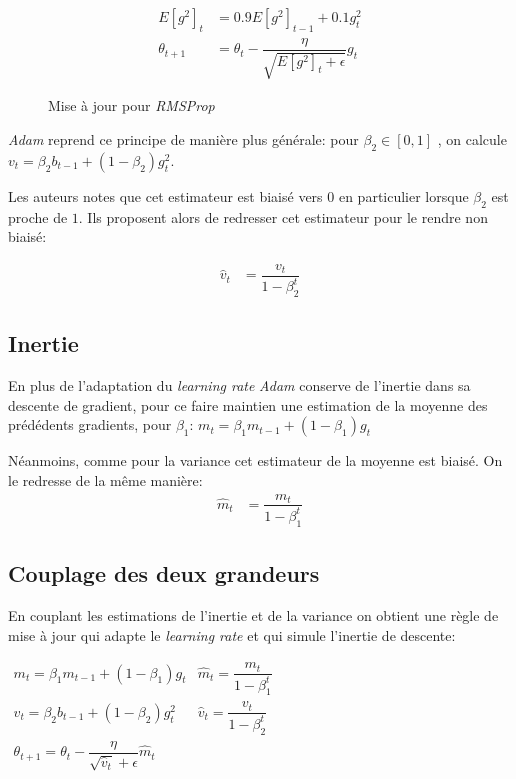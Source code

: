 \documentclass[fleqn,11pt, french, ceqn]{article}
\begin{document}
	\begin{figure}[H]
		\centering
		\begin{align*}
			E[g^2]_t &= 0.9 E[g^2]_{t-1} + 0.1 g^2_t \\ 
			\theta_{t+1} &= \theta_{t} - \dfrac{\eta}{\sqrt{E[g^2]_t + \epsilon}} g_{t} 
		\end{align*}
		\caption{Mise à jour pour \emph{RMSProp}}
	\end{figure}

	\emph{Adam} reprend ce principe de manière plus générale: pour $\beta_2 \in [0,1]$ , on calcule $v_t = \beta_2 b_{t-1} +  (1-\beta_2)g_t^2$.
	
	Les auteurs notes que cet estimateur est biaisé vers $0$ en particulier lorsque $\beta_2$ est proche de $1$. Ils proposent alors de redresser cet estimateur pour le rendre non biaisé:
	
	\begin{align*}
		\hat{v}_t &= \dfrac{v_t}{1 - \beta^t_2}
	\end{align*}
	
	\subsection{Inertie}
	
	En plus de l'adaptation du \emph{learning rate} \emph{Adam} conserve de l'inertie dans sa descente de gradient, pour ce faire maintien une estimation de la moyenne des prédédents gradients, pour $\beta_1$: $m_t = \beta_1 m_{t-1} + (1-\beta_1) g_t$
	
	Néanmoins, comme pour la variance cet estimateur de la moyenne est biaisé. On le redresse de la même manière:
	\begin{align*}
		\hat{m}_t &= \dfrac{m_t}{1 - \beta^t_1}
	\end{align*}
	
	\subsection{Couplage des deux grandeurs}
	
	En couplant les estimations de l'inertie et de la variance on obtient une règle de mise à jour qui adapte le \emph{learning rate} et qui simule l'inertie de descente:
	\begin{center}
	$
		\begin{array}{ll}
		m_t = \beta_1 m_{t-1} + (1-\beta_1) g_t & \hat{m}_t = \dfrac{m_t}{1 - \beta^t_1} \\
		v_t = \beta_2 b_{t-1} +  (1-\beta_2)g_t^2 & \hat{v}_t = \dfrac{v_t}{1 - \beta^t_2} \\
		
		\theta_{t+1} = \theta_{t} - \dfrac{\eta}{\sqrt{\hat{v}_t} + \epsilon} \hat{m}_t & \\
		\end{array}
	$
	\end{center}
\end{document}

